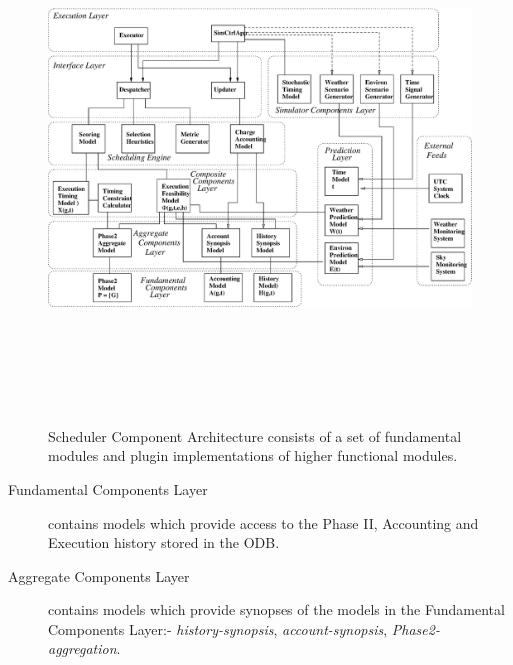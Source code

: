 \documentclass[12pt,a4paper]{article}
\begin{document}
{%
\begin{landscape}
   \begin{figure}[htp]
   \begin{center}
      \includegraphics[height=14cm]{figures/sca.eps}
 
      \caption[Scheduling Component Architecture.]
      {\label{fig:sca}
      Scheduler Component Architecture consists of a set of fundamental modules and plugin implementations of higher functional modules.}  
   \end{center}
   \end{figure} 
\end{landscape}

\begin{description}
\item[Fundamental Components Layer] contains models which provide access to the Phase II, Accounting and Execution history stored in the ODB.

\item[Aggregate Components Layer] contains models which provide synopses of the models in the Fundamental Components Layer:- \emph{history-synopsis}, \emph{account-synopsis}, \emph{Phase2-aggregation}.


\end{description}}
\end{document}
